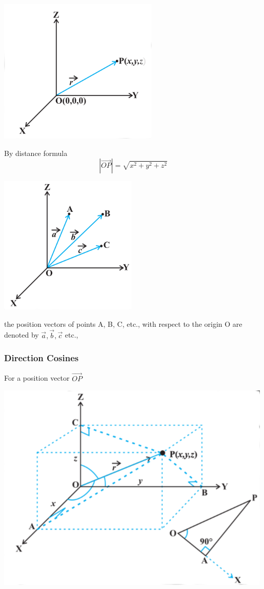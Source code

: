 \documentclass[12pt]{article}
\begin{document}
\begin{multicols*}{2}
\includegraphics*[scale=0.5]{2.png}

By distance formula $$|\vec{OP}|=\sqrt{x^2+y^2+z^2}$$

\includegraphics*[scale=0.5]{3.png}

the position vectors of points A, B, C, etc., with respect to the origin O
are denoted by $\vec{a},\vec{b},\vec{c}$ etc.,

\subsubsection*{Direction Cosines}
For a position vector $\vec{OP}$

\includegraphics*[scale=0.5]{4.png}


\end{multicols*}
\end{document}
